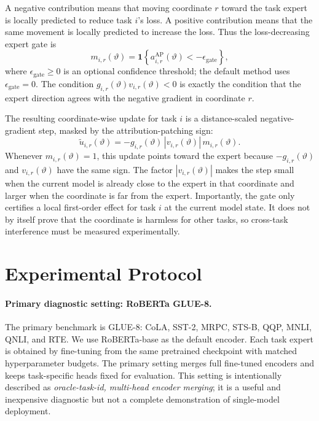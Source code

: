 \documentclass[11pt]{article}
\newcommand{\ind}{\mathbf{1}}
\begin{document}
A negative contribution means that moving coordinate $r$ toward the task expert is locally predicted to reduce task $i$'s loss. A positive contribution means that the same movement is locally predicted to increase the loss. Thus the loss-decreasing expert gate is
\begin{equation}
    m_{i,r}(\vartheta)
    =
    \ind\!
    \left\{
        a_{i,r}^{\mathrm{AP}}(\vartheta) < -\epsilon_{\mathrm{gate}}
    \right\},
    \label{eq:ap-gate}
\end{equation}
where $\epsilon_{\mathrm{gate}}\geq 0$ is an optional confidence threshold; the default method uses $\epsilon_{\mathrm{gate}}=0$. The condition $g_{i,r}(\vartheta)v_{i,r}(\vartheta)<0$ is exactly the condition that the expert direction agrees with the negative gradient in coordinate $r$.

The resulting coordinate-wise update for task $i$ is a distance-scaled negative-gradient step, masked by the attribution-patching sign:
\begin{equation}
    \widetilde u_{i,r}(\vartheta)
    =
    -g_{i,r}(\vartheta)\,\left|v_{i,r}(\vartheta)\right|\,m_{i,r}(\vartheta).
    \label{eq:raw-update}
\end{equation}
Whenever $m_{i,r}(\vartheta)=1$, this update points toward the expert because $-g_{i,r}(\vartheta)$ and $v_{i,r}(\vartheta)$ have the same sign. The factor $|v_{i,r}(\vartheta)|$ makes the step small when the current model is already close to the expert in that coordinate and larger when the coordinate is far from the expert. Importantly, the gate only certifies a local first-order effect for task $i$ at the current model state. It does not by itself prove that the coordinate is harmless for other tasks, so cross-task interference must be measured experimentally.


\section{Experimental Protocol}

\paragraph{Primary diagnostic setting: RoBERTa GLUE-8.}
The primary benchmark is GLUE-8: CoLA, SST-2, MRPC, STS-B, QQP, MNLI, QNLI, and RTE. We use RoBERTa-base as the default encoder. Each task expert is obtained by fine-tuning from the same pretrained checkpoint with matched hyperparameter budgets. The primary setting merges full fine-tuned encoders and keeps task-specific heads fixed for evaluation. This setting is intentionally described as \emph{oracle-task-id, multi-head encoder merging}; it is a useful and inexpensive diagnostic but not a complete demonstration of single-model deployment.
\end{document}

